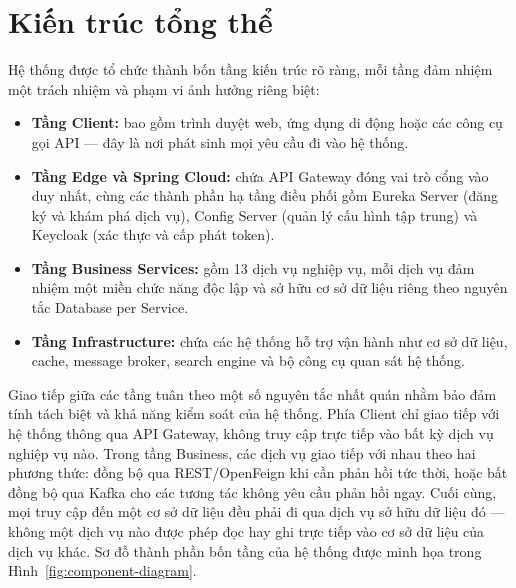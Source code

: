 \documentclass[../DoAn.tex]{subfiles}
\begin{document}
{\section{Kiến trúc tổng thể}
\label{section:4.3}

Hệ thống được tổ chức thành bốn tầng kiến trúc rõ ràng, mỗi tầng đảm nhiệm một trách nhiệm và
phạm vi ảnh hưởng riêng biệt:

\begin{itemize}[noitemsep]
    \item \textbf{Tầng Client:} bao gồm trình duyệt web, ứng dụng di động hoặc các công cụ
          gọi API --- đây là nơi phát sinh mọi yêu cầu đi vào hệ thống.
    \item \textbf{Tầng Edge và Spring Cloud:} chứa API Gateway đóng vai trò cổng vào duy
          nhất, cùng các thành phần hạ tầng điều phối gồm Eureka Server (đăng ký và khám phá
          dịch vụ), Config Server (quản lý cấu hình tập trung) và Keycloak (xác thực và cấp
          phát token).
    \item \textbf{Tầng Business Services:} gồm 13 dịch vụ nghiệp vụ, mỗi dịch vụ đảm nhiệm
          một miền chức năng độc lập và sở hữu cơ sở dữ liệu riêng theo nguyên tắc Database
          per Service.
    \item \textbf{Tầng Infrastructure:} chứa các hệ thống hỗ trợ vận hành như cơ sở dữ liệu,
          cache, message broker, search engine và bộ công cụ quan sát hệ thống.
\end{itemize}

Giao tiếp giữa các tầng tuân theo một số nguyên tắc nhất quán nhằm bảo đảm tính tách biệt và
khả năng kiểm soát của hệ thống. Phía Client chỉ giao tiếp với hệ thống thông qua API Gateway,
không truy cập trực tiếp vào bất kỳ dịch vụ nghiệp vụ nào. Trong tầng Business, các dịch vụ
giao tiếp với nhau theo hai phương thức: đồng bộ qua REST/OpenFeign khi cần phản hồi tức thời,
hoặc bất đồng bộ qua Kafka cho các tương tác không yêu cầu phản hồi ngay. Cuối cùng, mọi truy
cập đến một cơ sở dữ liệu đều phải đi qua dịch vụ sở hữu dữ liệu đó --- không một dịch vụ nào
được phép đọc hay ghi trực tiếp vào cơ sở dữ liệu của dịch vụ khác. Sơ đồ thành phần bốn tầng
của hệ thống được minh họa trong Hình~\ref{fig:component-diagram}.

}
\end{document}
